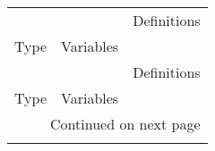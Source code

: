 \begin{longtable}[h!]{lll}
\toprule
               &                   &                                                                                          Definitions \\
Type & Variables &                                                                                                      \\
\midrule
\endfirsthead

\toprule
               &                   &                                                                                          Definitions \\
Type & Variables &                                                                                                      \\
\midrule
\endhead
\midrule
\multicolumn{3}{r}{{Continued on next page}} \\
\midrule
\endfoot


\end{longtable}
